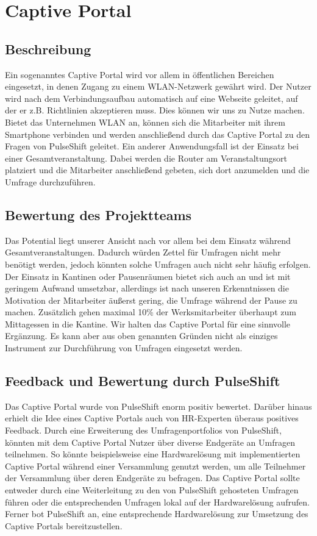 \section{Captive Portal}


\subsection{Beschreibung}
Ein sogenanntes Captive Portal wird vor allem in öffentlichen Bereichen eingesetzt, in denen Zugang zu einem WLAN-Netzwerk gewährt wird. Der Nutzer wird nach dem Verbindungsaufbau automatisch auf eine Webseite geleitet, auf der er z.B. Richtlinien akzeptieren muss. Dies können wir uns zu Nutze machen. Bietet das Unternehmen WLAN an, können sich die Mitarbeiter mit ihrem Smartphone verbinden und werden anschließend durch das Captive Portal zu den Fragen von PulseShift geleitet. Ein anderer Anwendungsfall ist der Einsatz bei einer Gesamtveranstaltung. Dabei werden die Router am Veranstaltungsort platziert und die Mitarbeiter anschließend gebeten, sich dort anzumelden und die Umfrage durchzuführen.

\subsection{Bewertung des Projektteams}
Das Potential liegt unserer Ansicht nach vor allem bei dem Einsatz während Gesamtveranstaltungen. Dadurch würden Zettel für Umfragen nicht mehr benötigt werden, jedoch könnten solche Umfragen auch nicht sehr häufig erfolgen. Der Einsatz in Kantinen oder Pausenräumen bietet sich auch an und ist mit geringem Aufwand umsetzbar, allerdings ist nach unseren Erkenntnissen die Motivation der Mitarbeiter äußerst gering, die Umfrage während der Pause zu machen. Zusätzlich gehen maximal 10\% der Werksmitarbeiter überhaupt zum Mittagessen in die Kantine.
Wir halten das Captive Portal für eine sinnvolle Ergänzung. Es kann aber aus oben genannten Gründen nicht als einziges Instrument zur Durchführung von Umfragen eingesetzt werden.

\subsection{Feedback und Bewertung durch PulseShift}
Das Captive Portal wurde von PulseShift enorm positiv bewertet. Darüber hinaus erhielt die Idee eines Captive Portals auch von HR-Experten überaus positives Feedback. Durch eine Erweiterung des Umfragenportfolios von PulseShift, könnten mit dem Captive Portal Nutzer über diverse Endgeräte an Umfragen teilnehmen. So könnte beispielsweise eine Hardwarelösung mit implementierten Captive Portal während einer Versammlung genutzt werden, um alle Teilnehmer der Versammlung über deren Endgeräte zu befragen. Das Captive Portal sollte entweder durch eine Weiterleitung zu den von PulseShift gehosteten Umfragen führen oder die entsprechenden Umfragen lokal auf der Hardwarelösung aufrufen. Ferner bot PulseShift an, eine entsprechende Hardwarelösung zur Umsetzung des Captive Portals bereitzustellen.

